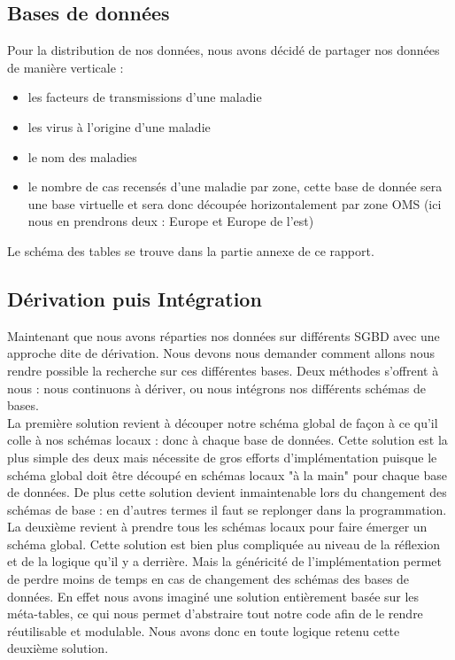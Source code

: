 \documentclass[12pt]{article}
\begin{document}
\subsection{Bases de données}

	Pour la distribution de nos données, nous avons décidé de partager nos données de manière verticale :\\
	\begin{itemize}
		\item les facteurs de transmissions d'une maladie\\
		\item les virus à l'origine d'une maladie\\
		\item le nom des maladies\\
		\item le nombre de cas recensés d'une maladie par zone, cette base de donnée sera une base virtuelle et sera donc découpée horizontalement par zone OMS (ici nous en prendrons deux : Europe et Europe de l'est)\\
	\end{itemize}
	
	\indent Le schéma des tables se trouve dans la partie annexe de ce rapport.

\subsection{Dérivation puis Intégration}

	Maintenant que nous avons réparties nos données sur différents SGBD avec une approche dite de dérivation. Nous devons nous demander comment allons nous rendre possible la recherche sur ces différentes bases. Deux méthodes s'offrent à nous : nous continuons à dériver, ou nous intégrons nos différents schémas de bases.\\
	\indent La première solution revient à découper notre schéma global de façon à ce qu'il colle à nos schémas locaux : donc à chaque base de données. Cette solution est la plus simple des deux mais nécessite de gros efforts d'implémentation puisque le schéma global doit être découpé en schémas locaux "à la main" pour chaque base de données. De plus cette solution devient inmaintenable lors du changement des schémas de base : en d'autres termes il faut se replonger dans la programmation.\\
	\indent La deuxième revient à prendre tous les schémas locaux pour faire émerger un schéma global. Cette solution est bien plus compliquée au niveau de la réflexion et de la logique qu'il y a derrière. Mais la généricité de l'implémentation permet de perdre moins de temps en cas de changement des schémas des bases de données. En effet nous avons imaginé une solution entièrement basée sur les méta-tables, ce qui nous permet d'abstraire tout notre code afin de le rendre réutilisable et modulable. Nous avons donc en toute logique retenu cette deuxième solution.\\
\end{document}
